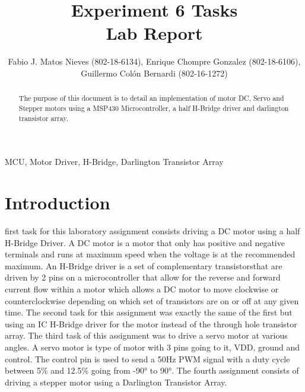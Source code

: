 \documentclass[journal]{IEEEtran}
\begin{document}
\title{Experiment 6 Tasks\\ Lab Report} \author{Fabio J. Matos
  Nieves (802-18-6134), Enrique Chompre Gonzalez (802-18-6106), \\Guillermo Colón Bernardi (802-16-1272)}
\maketitle
\begin{abstract}
  The purpose of this document is to detail an implementation of motor DC, Servo and Stepper motors using a MSP430 Microcontroller, a half H-Bridge driver and darlington transistor array.
\end{abstract}
\begin{IEEEkeywords}
  MCU, Motor Driver, H-Bridge, Darlington Transistor Array
\end{IEEEkeywords}
\IEEEpeerreviewmaketitle
\section{Introduction}
 first task for this laboratory assignment consists driving a DC motor using a half H-Bridge Driver. A DC motor is a motor that only has positive and negative terminals and runs at maximum speed when the voltage is at the recommended maximum. An H-Bridge driver is a set of complementary transistorsthat are driven by 2 pins on a microcontroller that allow for the reverse and forward current flow within a motor which allows a DC motor to move clockwise or counterclockwise depending on which set of transistors are on or off at any given time. The second task for this assignment was exactly the same of the first but using an IC H-Bridge driver for the motor instead of the through hole transistor array. The third task of this assignment was to drive a servo motor at various angles. A servo motor is type of motor with 3 pins going to it, VDD, ground and control. The control pin is used to send a 50\si{\Hz} PWM signal with a duty cycle between 5\% and 12.5\% going from \ang{-90} to \ang{90}. The fourth assignment consists of driving a stepper motor using a Darlington Transistor Array.
\end{document}
